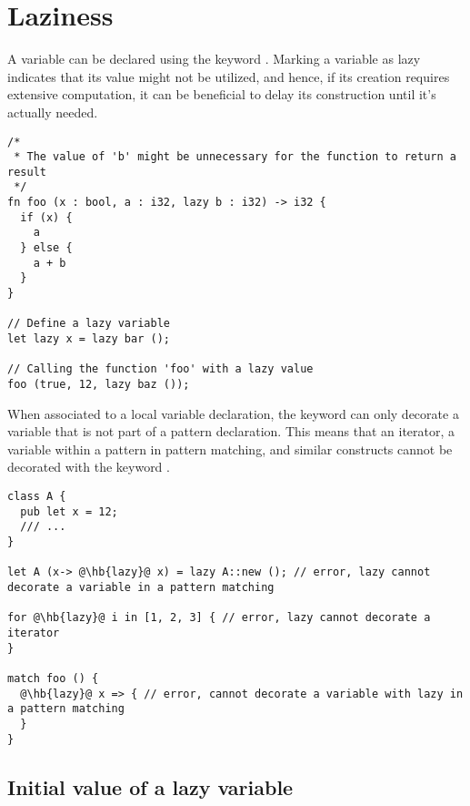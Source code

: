\section{Laziness}
\label{sec:variable_laziness}

A variable can be declared using the keyword . Marking a variable as
lazy indicates that its value might not be utilized, and hence, if its creation
requires extensive computation, it can be beneficial to delay its construction
until it's actually needed.


\begin{lstlisting}[style=coloredverbatim]
/*
 * The value of 'b' might be unnecessary for the function to return a result
 */
fn foo (x : bool, a : i32, lazy b : i32) -> i32 {
  if (x) {
    a
  } else {
    a + b
  }
}

// Define a lazy variable
let lazy x = lazy bar ();

// Calling the function 'foo' with a lazy value
foo (true, 12, lazy baz ());
\end{lstlisting}

When associated to a local variable declaration, the keyword  can
only decorate a variable that is not part of a pattern declaration. This means
that an iterator, a variable within a pattern in pattern matching, and similar
constructs cannot be decorated with the keyword .

\begin{lstlisting}[style=coloredverbatim, escapechar=@]
class A {
  pub let x = 12;
  /// ...
}

let A (x-> @\hb{lazy}@ x) = lazy A::new (); // error, lazy cannot decorate a variable in a pattern matching

for @\hb{lazy}@ i in [1, 2, 3] { // error, lazy cannot decorate a iterator
}

match foo () {
  @\hb{lazy}@ x => { // error, cannot decorate a variable with lazy in a pattern matching
  }
}
\end{lstlisting}

\subsection {Initial value of a lazy variable}
\label{sec:lazy_param}

